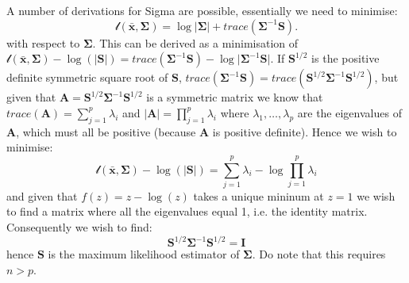 \begin{theorem}
A number of derivations for Sigma are possible, essentially we need to minimise:
\begin{equation}
\mathscr{l}(\bar{\boldsymbol{x}}, \boldsymbol{\Sigma}) = \log \lvert \boldsymbol{\Sigma} \rvert + trace( \boldsymbol{\Sigma}^{-1} \boldsymbol{S}).
\end{equation}
with respect to $\boldsymbol{\Sigma}$.   This can be derived as a minimisation of $\mathscr{l}(\bar{\boldsymbol{x}},\boldsymbol{\Sigma})  - \log( \lvert \boldsymbol{S} \rvert) = trace( \boldsymbol{\Sigma}^{-1} \boldsymbol{S}) - \log \lvert \boldsymbol{\Sigma}^{-1} \boldsymbol{S} \rvert$.   If $\boldsymbol{S}^{1/2}$ is the positive definite symmetric square root of $\boldsymbol{S}$,  $trace( \boldsymbol{\Sigma}^{-1} \boldsymbol{S}) =  trace( \boldsymbol{S}^{1/2} \boldsymbol{\Sigma}^{-1} \boldsymbol{S}^{1/2})$, but given that $\boldsymbol{A} =  \boldsymbol{S}^{1/2} \boldsymbol{\Sigma}^{-1} \boldsymbol{S}^{1/2}$ is a symmetric matrix we know that $trace(\boldsymbol{A}) = \sum_{j=1}^{p} \lambda_{i}$ and $\lvert \boldsymbol{A} \rvert = \prod_{j=1}^{p} \lambda_{i}$ where $\lambda_{1}, \ldots, \lambda_{p}$ are the eigenvalues of $\boldsymbol{A}$, which must all be positive (because $\boldsymbol{A}$ is positive definite).   Hence we wish to minimise:
\begin{equation}
\mathscr{l}(\bar{\boldsymbol{x}},\boldsymbol{\Sigma})  - \log( \lvert \boldsymbol{S} \rvert) =  \sum_{j=1}^{p} \lambda_{i} - \log  \prod_{j=1}^{p} \lambda_{i}
\end{equation}
and given that $f(z) = z - \log(z)$ takes a unique mininum at $z=1$ we wish to find a matrix where all the eigenvalues equal 1, i.e. the identity matrix.   Consequently we wish to find:
\begin{equation}
 \boldsymbol{S}^{1/2} \boldsymbol{\Sigma}^{-1} \boldsymbol{S}^{1/2} = \boldsymbol{I}
\end{equation}
hence $\boldsymbol{S}$ is the maximum likelihood estimator of $\boldsymbol{\Sigma}$.   Do note that this requires $n>p$.


\end{theorem}